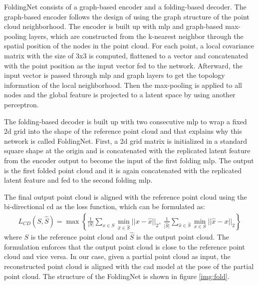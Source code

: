 \documentclass[12pt,DIV14,BCOR12mm,a4paper,footinclude=false,headinclude,parskip=half-,twoside,openright,cleardoublepage=empty,toc=index,bibliography=totoc,listof=totoc]{scrreprt}
\numberwithin{equation}{chapter}
\begin{document}
FoldingNet consists of a graph-based encoder and a folding-based decoder. The graph-based encoder follows the design of \cite{shen2018mining} using the graph structure of the point cloud neighborhood. The encoder is built up with \gls{mlp} and graph-based max-pooling layers, which are constructed from the k-nearest neighbor through the spatial position of the nodes in the point cloud. For each point, a local covariance matrix with the size of 3x3 is computed, flattened to a vector and concatenated with the point position as the input vector fed to the network. Afterward, the input vector is passed through \gls{mlp} and graph layers to get the topology information of the local neighborhood. Then the max-pooling is applied to all nodes and the global feature is projected to a latent space by using another perceptron.

The folding-based decoder is built up with two consecutive \gls{mlp} to wrap a fixed \gls{2d} grid into the shape of the reference point cloud and that explains why this network is called FoldingNet. First, a \gls{2d} grid matrix is initialized in a standard square shape at the origin and is concatenated with the replicated latent feature from the encoder output to become the input of the first folding \gls{mlp}. The output is the first folded point cloud and it is again concatenated with the replicated latent feature and fed to the second folding \gls{mlp}.

The final output point cloud is aligned with the reference point cloud using the bi-directional \gls{cd} as the loss function, which can be formulated as:
\begin{align}\label{eq:cd}
  L_{CD}(S, \hat{S}) = \max \left\{\frac{1}{\lvert S\rvert }\mathop{\sum}_{x\in S} \mathop{\min}_{\hat{x}\in \hat{S}}||x-\hat{x}||_{2} ,\ \frac{1}{\lvert \hat{S}\rvert }\mathop{\sum}_{\hat{x}\in \hat{S}} \mathop{\min}_{x\in S}||\hat{x}-x||_{2}\right\}
\end{align}
where $S$ is the reference point cloud and $\hat{S}$ is the output point cloud. The formulation enforces that the output point cloud is close to the reference point cloud and vice versa. In our case, given a partial point cloud as input, the reconstructed point cloud is aligned with the \gls{cad} model at the pose of the partial point cloud. The structure of the FoldingNet is shown in figure \ref{img:fold}.
\end{document}
